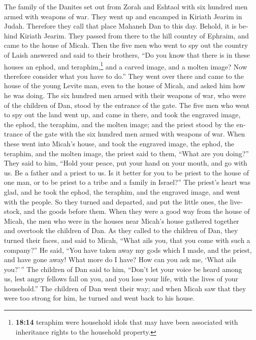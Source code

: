 \begin{paracol}{2}
\begin{otherlanguage}{english}
 The family of the Danites set out from Zorah and Eshtaol
with six hundred men armed with weapons of war.  They
went up and encamped in Kiriath Jearim in Judah. Therefore they call
that place Mahaneh Dan to this day. Behold, it is behind Kiriath Jearim.
 They passed from there to the hill country of Ephraim,
and came to the house of Micah.  Then the five men who
went to spy out the country of Laish answered and said to their
brothers, ``Do you know that there is in these houses an ephod, and
teraphim,\footnote{\textbf{18:14} teraphim were household idols that may
  have been associated with inheritance rights to the household
  property.} and a carved image, and a molten image? Now therefore
consider what you have to do.''  They went over there and
came to the house of the young Levite man, even to the house of Micah,
and asked him how he was doing.  The six hundred men
armed with their weapons of war, who were of the children of Dan, stood
by the entrance of the gate.  The five men who went to
spy out the land went up, and came in there, and took the engraved
image, the ephod, the teraphim, and the molten image; and the priest
stood by the entrance of the gate with the six hundred men armed with
weapons of war.  When these went into Micah's house, and
took the engraved image, the ephod, the teraphim, and the molten image,
the priest said to them, ``What are you doing?''  They
said to him, ``Hold your peace, put your hand on your mouth, and go with
us. Be a father and a priest to us. Is it better for you to be priest to
the house of one man, or to be priest to a tribe and a family in
Israel?''  The priest's heart was glad, and he took the
ephod, the teraphim, and the engraved image, and went with the people.
 So they turned and departed, and put the little ones,
the livestock, and the goods before them.  When they were
a good way from the house of Micah, the men who were in the houses near
Micah's house gathered together and overtook the children of Dan.
 As they called to the children of Dan, they turned their
faces, and said to Micah, ``What ails you, that you come with such a
company?''  He said, ``You have taken away my gods which
I made, and the priest, and have gone away! What more do I have? How can
you ask me, `What ails you?'\,''  The children of Dan
said to him, ``Don't let your voice be heard among us, lest angry
fellows fall on you, and you lose your life, with the lives of your
household.''  The children of Dan went their way; and
when Micah saw that they were too strong for him, he turned and went
back to his house.


\end{otherlanguage}
\end{paracol}
